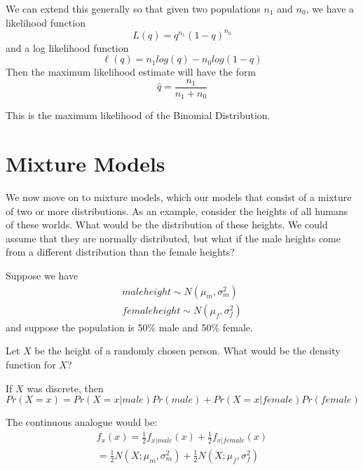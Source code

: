 \documentclass[12pt]{report}
\begin{document}
We can extend this generally so that given two populations $n_1$ and $n_0$, we have a likelihood function \begin{equation}
L(q) = q^{n_1}(1-q)^{n_0}
\end{equation}
and a log likelihood function \begin{equation}
\ell(q) = n_1log(q) - n_0log(1-q)
\end{equation}
Then the maximum likelihood estimate will have the form \begin{equation}
\hat{q} = \frac{n_1}{n_1+n_0}
\end{equation}

This is the maximum likelihood of the Binomial Distribution.

\section{Mixture Models}
We now move on to mixture models, which our models that consist of a mixture of two or more distributions. As an example, consider the heights of all humans of these worlds. What would be the distribution of these heights. We could assume that they are normally distributed, but what if the male heights come from a different distribution than the female heights?

Suppose we have \begin{equation}
\begin{aligned}
male height\sim N(\mu_m,\sigma^2_m)\\
female height \sim N(\mu_f,\sigma^2_f)
\end{aligned}
\end{equation} and suppose the population is 50\% male and 50\% female.

Let $X$ be the height of a randomly chosen person. What would be the density function for $X$?

If $X$ was discrete, then \begin{equation}
Pr(X=x) = Pr(X = x|male)Pr(male) + Pr(X=x|female)Pr(female)
\end{equation}

The continuous analogue would be:
\begin{equation}
\begin{aligned}
f_x(x) = \frac{1}{2}f_{x|male}(x) + \frac{1}{2}f_{x|female}(x) \\
= \frac{1}{2}N(X;\mu_m,\sigma^2_m) +  \frac{1}{2}N(X;\mu_f,\sigma^2_f)
\end{aligned}
\end{equation}
\end{document}
